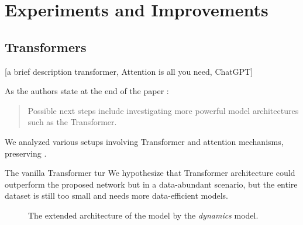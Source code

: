 \chapter{Experiments and Improvements}\label{experiments_and_improvements}

\section{Transformers}

[a brief description transformer, Attention is all you need, ChatGPT]

As the authors state at the end of the paper \cite{Liu2022}:

\begin{quote}Possible next steps include investigating more powerful model architectures such as the Transformer.\end{quote}

We analyzed various setups involving Transformer and attention mechanisms, preserving . 

The vanilla Transformer tur
We hypothesize that Transformer architecture could outperform the proposed network but in a data-abundant scenario, but the entire dataset is still too small and needs more data-efficient models.

\begin{figure}[!ht]
\centering

\caption[The extended architecture of the model.]{The extended architecture of the model by the \emph{dynamics} model.}
\end{figure}
 
